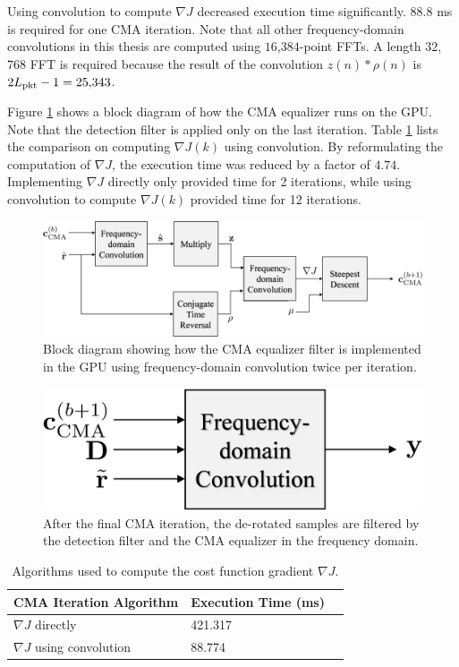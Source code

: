 Using convolution to compute $\nabla J$ decreased execution time significantly.
$88.8$ ms is required for one CMA iteration.
Note that all other frequency-domain convolutions in this thesis are computed using $16$,$384$-point FFTs.
A length $32$,$768$ FFT is required because the result of the convolution $z(n) * \rho(n)$ is $2L_\text{pkt}-1 = 25{,}343$.

Figure \ref{fig:blockCMA} shows a block diagram of how the CMA equalizer runs on the GPU.
Note that the detection filter is applied only on the last iteration.
Table \ref{tab:CMAtimingComparison} lists the comparison on computing $\nabla J(k)$ using convolution.
By reformulating the computation of $\nabla J$, the execution time was reduced by a factor of $4.74$.
Implementing $\nabla J$ directly only provided time for 2 iterations, while using convolution to compute $\nabla J(k)$ provided time for 12 iterations.
\begin{figure}
	\centering\includegraphics[width=10.66in/100*55]{figures/eq_GPUimplementation/blockCMA.pdf}
	\caption{Block diagram showing how the CMA equalizer filter is implemented in the GPU using frequency-domain convolution twice per iteration.}
	\label{fig:blockCMA}
\end{figure}
\begin{figure}
	\centering\includegraphics[width=3.95in/100*55]{figures/eq_GPUimplementation/blockCMA_apply.pdf}
	\caption{After the final CMA iteration, the de-rotated samples are filtered by the detection filter and the CMA equalizer in the frequency domain.}
	\label{fig:blockCMA_apply}
\end{figure}
\begin{table}
\caption{Algorithms used to compute the cost function gradient $\nabla J$.}
\begin{center}
\begin{tabular}{lll}
	\toprule
	CMA	Iteration Algorithm		& Execution Time (ms)	\\ \midrule
	$\nabla J$ directly 		& 421.317				\\
	$\nabla J$ using convolution & 88.774				\\
	\bottomrule
\end{tabular}
\end{center}
\label{tab:CMAtimingComparison}
\end{table}


